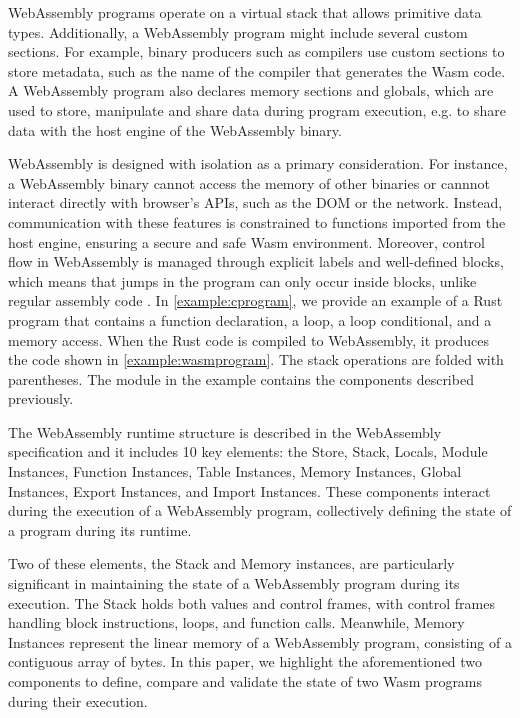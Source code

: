 \documentclass[sigplan,screen]{acmart}
\newcommand*\badge[1]{ \colorbox{red}{\color{white}#1}}
\newcommand{\todo}[1]{%
\refstepcounter{todo}
\noindent\textbf{\badge{TODO}} {\color{red}#1}
\addcontentsline{td}{todo}
{\color{red}\thesection.\thetodo\xspace #1}}
\begin{document}


WebAssembly programs operate on a virtual stack that allows primitive data types.
Additionally, a WebAssembly program might include several custom sections.
For example, binary producers such as compilers use custom sections to store metadata, such as the name of the compiler that generates the Wasm code.
A WebAssembly program also declares memory sections and globals, which are used to store, manipulate and share data during program execution, e.g. to share data with the host engine of the WebAssembly binary.

WebAssembly is designed with isolation as a primary consideration. For instance, a WebAssembly binary cannot access the memory of other binaries or cannnot interact directly with browser's APIs, such as the DOM or the network. Instead, communication with these features is constrained to functions imported from the host engine, ensuring a secure and safe Wasm environment.
Moreover, control flow in WebAssembly is managed through explicit labels and well-defined blocks, which means that jumps in the program can only occur inside blocks, unlike regular assembly code \cite{10.1145/3062341.3062363}. 
In \autoref{example:cprogram}, we provide an example of a Rust program that contains a function declaration, a loop, a loop conditional, and a memory access. When the Rust code is compiled to WebAssembly, it produces the code shown in \autoref{example:wasmprogram}. The stack operations are folded with parentheses.
The module in the example contains the components described previously.


The WebAssembly runtime structure is described in the WebAssembly specification and it includes 10 key elements: the Store, Stack, Locals, Module Instances, Function Instances, Table Instances, Memory Instances, Global Instances, Export Instances, and Import Instances. These components interact during the execution of a WebAssembly program, collectively defining the state of a program during its runtime.

Two of these elements, the Stack and Memory instances, are particularly significant in maintaining the state of a WebAssembly program during its execution. The Stack holds both values and control frames, with control frames handling block instructions, loops, and function calls. Meanwhile, Memory Instances represent the linear memory of a WebAssembly program, consisting of a contiguous array of bytes.
In this paper, we highlight the aforementioned two components to define, compare and validate the state of two Wasm programs during their execution. 
\end{document}
